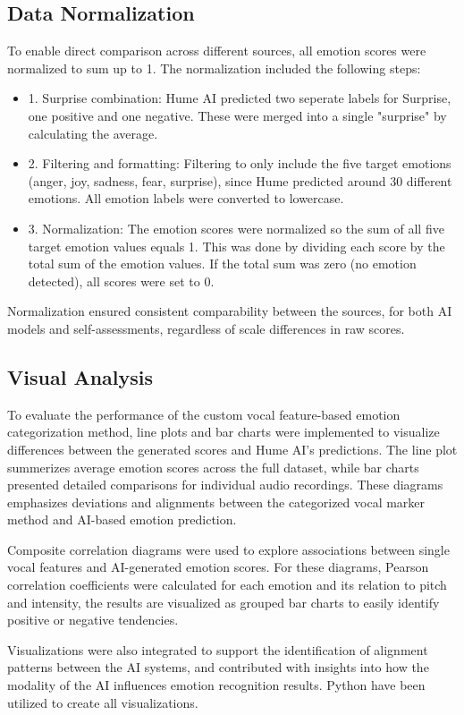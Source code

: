 \subsection{Data Normalization}
To enable direct comparison across different sources, all emotion scores were normalized to sum up to 1. The normalization included the following steps: 
\begin{itemize}
    \item 1. Surprise combination: Hume AI predicted two seperate labels for Surprise, one positive and one negative. These were merged into a single "surprise" by calculating the average. 
    \item 2. Filtering and formatting: Filtering to only include the five target emotions (anger, joy, sadness, fear, surprise), since Hume predicted around 30 different emotions. All emotion labels were converted to lowercase. 
    \item 3. Normalization: The emotion scores were normalized so the sum of all five target emotion values equals 1. This was done by dividing each score by the total sum of the emotion values. If the total sum was zero (no emotion detected), all scores were set to 0. 
\end{itemize}
Normalization ensured consistent comparability between the sources, for both AI models and self-assessments, regardless of scale differences in raw scores. 
\subsection{Visual Analysis}

To evaluate the performance of the custom vocal feature-based emotion categorization method, line plots and bar charts were implemented to visualize differences between the generated scores and Hume AI's predictions. 
The line plot summerizes average emotion scores across the full dataset, while bar charts presented detailed comparisons for individual audio recordings. 
These diagrams emphasizes deviations and alignments between the categorized vocal marker method and AI-based emotion prediction. 

Composite correlation diagrams were used to explore associations between single vocal features and AI-generated emotion scores. 
For these diagrams, Pearson correlation coefficients were calculated for each emotion and its relation to pitch and intensity, the results are visualized as grouped bar charts to easily identify positive or negative tendencies. 

Visualizations were also integrated to support the identification of alignment patterns between the AI systems, and contributed with insights into how the modality of the AI influences emotion recognition results. 
Python have been utilized to create all visualizations. 

